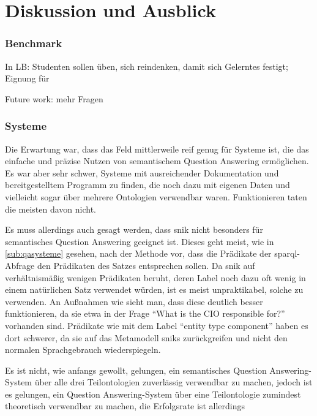 \chapter{Diskussion und Ausblick}\label{ch:discussion}

\subsection{Benchmark}

In LB: Studenten sollen üben, sich reindenken, damit sich Gelerntes festigt; Eignung für

Future work: mehr Fragen

\subsection{Systeme}

Die Erwartung war, dass das Feld mittlerweile reif genug für Systeme ist, die das einfache und präzise Nutzen von semantischem Question Answering ermöglichen.
Es war aber sehr schwer, Systeme mit ausreichender Dokumentation und bereitgestelltem Programm zu finden, die noch dazu mit eigenen Daten und vielleicht sogar über mehrere Ontologien verwendbar waren.
Funktionieren taten die meisten davon nicht.

Es muss allerdings auch gesagt werden, dass \ac{snik} nicht besonders für semantisches Question Answering geeignet ist.
Dieses geht meist, wie in \cref{sub:qasysteme} gesehen, nach der Methode vor, dass die Prädikate der \ac{sparql}-Abfrage den Prädikaten des Satzes entsprechen sollen.
Da \ac{snik} auf verhältnismäßig wenigen Prädikaten beruht, deren Label noch dazu oft wenig in einem natürlichen Satz verwendet würden, ist es meist unpraktikabel, solche zu verwenden.
An Außnahmen wie  sieht man, dass diese deutlich besser funktionieren, da sie etwa in der Frage \enquote{What is the CIO responsible for?} vorhanden sind.
Prädikate wie  mit dem Label \enquote{entity type component} haben es dort schwerer, da sie auf das Metamodell \ac{snik}s zurückgreifen
und nicht den normalen Sprachgebrauch wiederspiegeln.

Es ist nicht, wie anfangs gewollt, gelungen, ein semantisches Question Answering-System über alle drei Teilontologien zuverlässig verwendbar zu machen,
jedoch ist es gelungen, ein Question Answering-System über eine Teilontologie zumindest theoretisch verwendbar zu machen, die Erfolgsrate ist allerdings 
